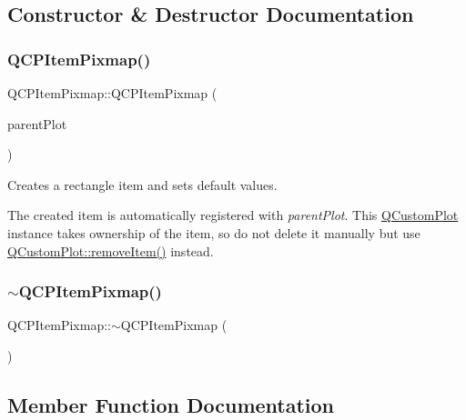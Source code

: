 \subsection{Constructor \& Destructor Documentation}
\mbox{\label{class_q_c_p_item_pixmap_aa6de42a37261b21a5480e7da122345c3}} 
\subsubsection{\texorpdfstring{QCPItemPixmap()}{QCPItemPixmap()}}
{\footnotesize\ttfamily Q\+C\+P\+Item\+Pixmap\+::\+Q\+C\+P\+Item\+Pixmap (\begin{DoxyParamCaption}\item[{\mbox{\hyperlink{class_q_custom_plot}{Q\+Custom\+Plot}} $\ast$}]{parent\+Plot }\end{DoxyParamCaption})\hspace{0.3cm}{\ttfamily [explicit]}}

Creates a rectangle item and sets default values.

The created item is automatically registered with {\itshape parent\+Plot}. This \mbox{\hyperlink{class_q_custom_plot}{Q\+Custom\+Plot}} instance takes ownership of the item, so do not delete it manually but use \mbox{\hyperlink{class_q_custom_plot_ae04446557292551e8fb6e2c106e1848d}{Q\+Custom\+Plot\+::remove\+Item()}} instead. \mbox{\label{class_q_c_p_item_pixmap_a810cac6a409d963cda6ea2d3152f1fd0}} 
\subsubsection{\texorpdfstring{$\sim$QCPItemPixmap()}{~QCPItemPixmap()}}
{\footnotesize\ttfamily Q\+C\+P\+Item\+Pixmap\+::$\sim$\+Q\+C\+P\+Item\+Pixmap (\begin{DoxyParamCaption}{ }\end{DoxyParamCaption})\hspace{0.3cm}{\ttfamily [virtual]}}



\subsection{Member Function Documentation}
\mbox{\label{class_q_c_p_item_pixmap_a5803d8e173bc4d48619fc43701db32e5}} 
